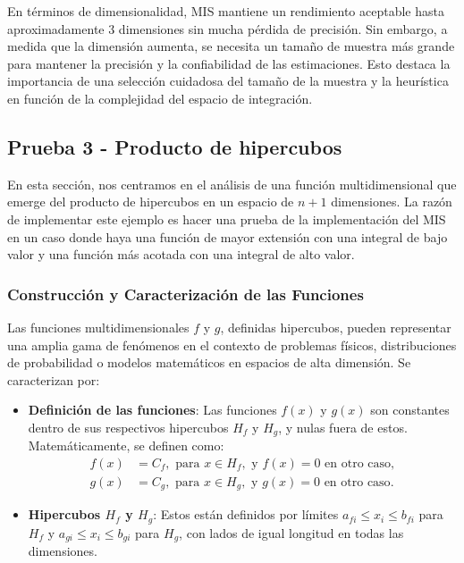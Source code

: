 \documentclass{article}
\begin{document}
En términos de dimensionalidad, MIS mantiene un rendimiento aceptable hasta aproximadamente 3 dimensiones sin mucha pérdida de precisión. Sin embargo, a medida que la dimensión aumenta, se necesita un tamaño de muestra más grande para mantener la precisión y la confiabilidad de las estimaciones. Esto destaca la importancia de una selección cuidadosa del tamaño de la muestra y la heurística en función de la complejidad del espacio de integración.

\subsection{Prueba 3 - Producto de hipercubos}

En esta sección, nos centramos en el análisis de una función multidimensional que emerge del producto de hipercubos en un espacio de \( n + 1 \) dimensiones.
La razón de implementar este ejemplo es hacer una prueba de la implementación del MIS en un caso donde haya una función de mayor extensión con una integral de bajo valor y una función más acotada con una integral de alto valor.

\subsubsection{Construcción y Caracterización de las Funciones}
Las funciones multidimensionales \( f \) y \( g \), definidas hipercubos, pueden representar una amplia gama de fenómenos en el contexto de problemas físicos, distribuciones de probabilidad o modelos matemáticos en espacios de alta dimensión. Se caracterizan por:

\begin{itemize}
    \item \textbf{Definición de las funciones}: Las funciones \( f(x) \) y \( g(x) \) son constantes dentro de sus respectivos hipercubos \( H_f \) y \( H_g \), y nulas fuera de estos. Matemáticamente, se definen como:
    \begin{align*}
        f(x) &= C_f, \text{ para } x \in H_f, \text{ y } f(x) = 0 \text{ en otro caso}, \\
        g(x) &= C_g, \text{ para } x \in H_g, \text{ y } g(x) = 0 \text{ en otro caso}.
    \end{align*}
    \item \textbf{Hipercubos \( H_f \) y \( H_g \)}: Estos están definidos por límites \( a_{fi} \leq x_i \leq b_{fi} \) para \( H_f \) y \( a_{gi} \leq x_i \leq b_{gi} \) para \( H_g \), con lados de igual longitud en todas las dimensiones.
\end{itemize}
\end{document}
